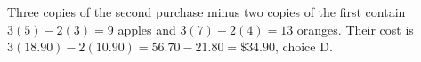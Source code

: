 Three copies of the second purchase minus two copies of the first contain $3(5)-2(3)=9$ apples and $3(7)-2(4)=13$ oranges. Their cost is $3(18.90)-2(10.90)=56.70-21.80=\boxed{\$34.90}$, choice D.
